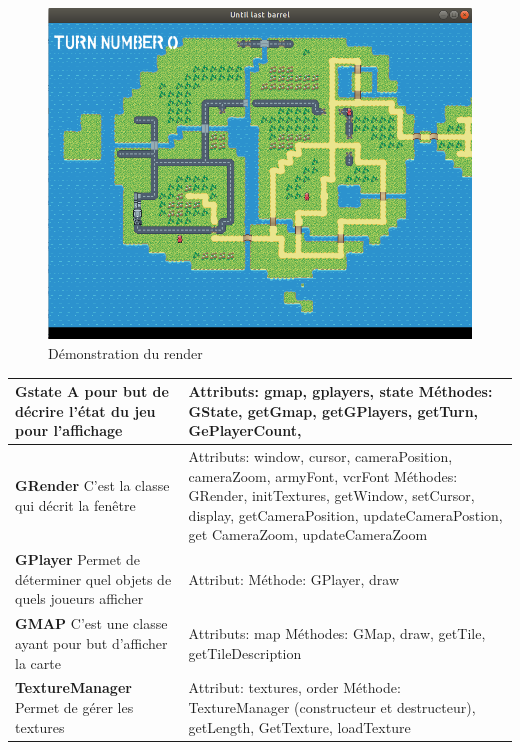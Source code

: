 \begin{figure}[h]
    \centering
    \includegraphics[angle=0,origin=c,scale =0.5]{images/demorender.png}
    \caption{Démonstration du render}
    \label{fig:Advance Wars}
\end{figure}

\newpage

\phantom{Texte invisible parce que j'ai pas trouvé d'autre méthode pour mettre le tableau à la ligne.}

\begin{tabularx}{15 cm}{|X|X|}
\hline
\textbf{Gstate} \newline A pour but de décrire l'état du jeu pour l'affichage & Attributs: gmap, gplayers, state \newline Méthodes: GState, getGmap, getGPlayers, getTurn, GePlayerCount,\\ 
\hline
\textbf{GRender} \newline C'est la classe qui décrit la fenêtre  & Attributs: window, cursor, cameraPosition, cameraZoom, armyFont, vcrFont \newline Méthodes: GRender, initTextures, getWindow, setCursor, display, getCameraPosition, updateCameraPostion, get CameraZoom, updateCameraZoom\\
\hline
\textbf{GPlayer} \newline Permet de déterminer quel objets de quels joueurs afficher & Attribut:  \newline Méthode: GPlayer, draw\\
\hline
\textbf{GMAP} \newline C'est une classe ayant pour but d'afficher la carte & Attributs: map
\newline Méthodes: GMap, draw, getTile, getTileDescription\\
\hline

\textbf{TextureManager} \newline Permet de gérer les textures & Attribut: textures, order \newline Méthode: TextureManager (constructeur et destructeur), getLength, GetTexture, loadTexture\\
\hline

\end{tabularx}

